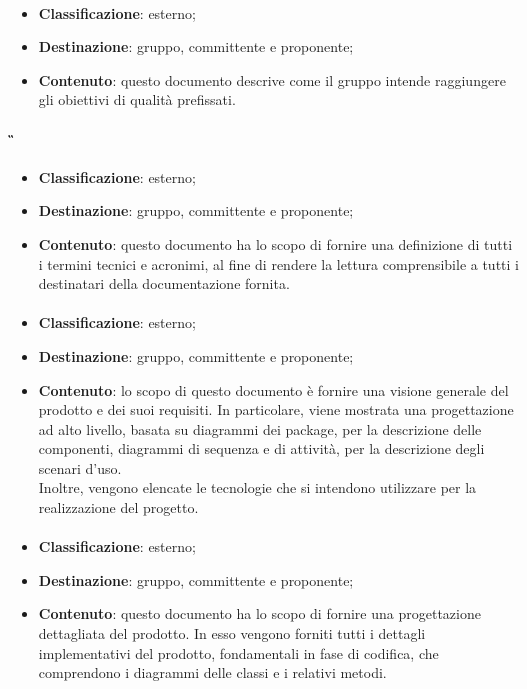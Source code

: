 			\paragraph{\PdQ}
			\begin{itemize}
				\item \textbf{Classificazione}: esterno;
				\item \textbf{Destinazione}: gruppo, committente e proponente;
				\item \textbf{Contenuto}: questo documento descrive come il gruppo \textit{\gruppo} intende raggiungere gli obiettivi di qualità prefissati.
			\end{itemize}

			\paragraph{\G}
			\begin{itemize}
				\item \textbf{Classificazione}: esterno;
				\item \textbf{Destinazione}: gruppo, committente e proponente;
				\item \textbf{Contenuto}: questo documento ha lo scopo di fornire una definizione di tutti i termini tecnici e acronimi, al fine di rendere la lettura comprensibile a tutti i destinatari della documentazione fornita.
			\end{itemize}
		\paragraph{\ST}
		\begin{itemize}
			\item \textbf{Classificazione}: esterno;
			\item \textbf{Destinazione}: gruppo, committente e proponente;
			\item \textbf{Contenuto}: lo scopo di questo documento è fornire una visione generale del prodotto e dei suoi requisiti. In particolare, viene mostrata una progettazione ad
			alto livello, basata su diagrammi dei package, per la descrizione delle componenti, diagrammi di sequenza e di attività, per la descrizione degli scenari d'uso.\\
			Inoltre, vengono elencate le tecnologie che si intendono utilizzare per la realizzazione del progetto.
		\end{itemize}
		
		\paragraph{\DDP}
		\begin{itemize}
			\item \textbf{Classificazione}: esterno;
			\item \textbf{Destinazione}: gruppo, committente e proponente;
			\item \textbf{Contenuto}: questo documento ha lo scopo di fornire una progettazione dettagliata del
			prodotto. In esso vengono forniti tutti i dettagli implementativi del prodotto, fondamentali in fase di codifica, che comprendono i diagrammi delle classi e i relativi metodi.
		\end{itemize}
	
